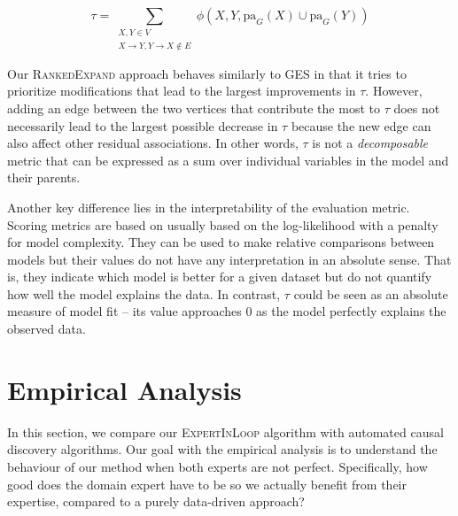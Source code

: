 \documentclass[accepted]{uai2025} %
\begin{document}
\begin{equation}
	\tau = \sum_{\substack{X, Y \in V \\ X \rightarrow Y, Y \rightarrow X \not \in E}}   \phi(X, Y, \mathrm{pa}_G(X) \cup \mathrm{pa}_G(Y))
\label{eqn:tau}
\end{equation}

Our \textsc{RankedExpand} approach behaves similarly to GES in that it 
tries to prioritize modifications that lead to the largest improvements 
in $\tau$. However, adding an edge between the two vertices that contribute
the most to $\tau$ does not necessarily lead to the largest 
possible decrease in $\tau$ because the new edge can also affect other 
residual associations. In other words, $\tau$ is not a \emph{decomposable}
metric that can be expressed as a sum over individual variables in the model
and their parents. 

Another key difference lies in the interpretability of the evaluation metric.
Scoring metrics are based on usually based on the log-likelihood with a penalty
for model complexity. They can be used to make relative comparisons between
models but their values do not have any interpretation in an absolute sense.
That is, they indicate which model is better for a given dataset but do not
quantify how well the model explains the data. In
contrast, $ \tau $ could be seen as an absolute measure of model fit -- 
its value approaches $ 0 $ as the model perfectly explains the observed data.

\section{Empirical Analysis}
\label{sec:empirical}

In this section, we compare our \textsc{ExpertInLoop} algorithm with automated
causal discovery algorithms. Our goal with the empirical analysis is to
understand the behaviour of our method when both experts are not perfect.
Specifically, how good does the domain expert have to be so we actually benefit
from their expertise, compared to a purely data-driven approach? 
\end{document}
